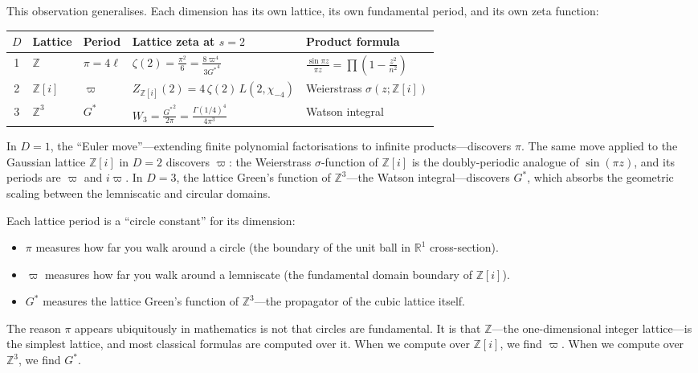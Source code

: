 \documentclass[12pt]{article}
\newcommand{\Z}{\mathbb{Z}}
\newcommand{\R}{\mathbb{R}}
\begin{document}
This observation generalises.  Each dimension has its own lattice, its
own fundamental period, and its own zeta function:

\medskip
\begin{center}
\begin{tabular}{cllll}
\toprule
$D$ & Lattice & Period & Lattice zeta at $s=2$ & Product formula\\
\midrule
1 & $\Z$ & $\pi = 4\ell$
  & $\displaystyle\zeta(2) = \frac{\pi^2}{6} = \frac{8\varpi^4}{3{G^{*}}^4}$
  & $\displaystyle\frac{\sin\pi z}{\pi z} = \prod\!\left(1-\frac{z^2}{n^2}\right)$\\[10pt]
2 & $\Z[i]$ & $\varpi$
  & $\displaystyle Z_{\Z[i]}(2) = 4\,\zeta(2)\,L(2,\chi_{-4})$
  & Weierstrass $\sigma(z;\Z[i])$\\[10pt]
3 & $\Z^3$ & ${G^{*}}$
  & $\displaystyle W_3 = \frac{{G^{*}}^2}{2\pi} = \frac{\Gamma(1/4)^4}{4\pi^3}$
  & Watson integral\\
\bottomrule
\end{tabular}
\end{center}
\medskip

In $D = 1$, the ``Euler move''---extending finite polynomial
factorisations to infinite products---discovers $\pi$.  The same move
applied to the Gaussian lattice $\Z[i]$ in $D = 2$ discovers $\varpi$:
the Weierstrass $\sigma$-function of $\Z[i]$ is the doubly-periodic
analogue of $\sin(\pi z)$, and its periods are $\varpi$ and $i\varpi$.  In
$D = 3$, the lattice Green's function of $\Z^3$---the Watson
integral---discovers ${G^{*}}$, which absorbs the geometric scaling
between the lemniscatic and circular domains.

Each lattice period is a ``circle constant'' for its dimension:
\begin{itemize}
\item $\pi$ measures how far you walk around a circle (the boundary of
  the unit ball in $\R^1$ cross-section).
\item $\varpi$ measures how far you walk around a lemniscate (the
  fundamental domain boundary of $\Z[i]$).
\item ${G^{*}}$ measures the lattice Green's function of $\Z^3$---the
  propagator of the cubic lattice itself.
\end{itemize}

The reason $\pi$ appears ubiquitously in mathematics is not that circles
are fundamental.  It is that $\Z$---the one-dimensional integer
lattice---is the simplest lattice, and most classical formulas are
computed over it.  When we compute over $\Z[i]$, we find $\varpi$.  When
we compute over $\Z^3$, we find ${G^{*}}$.
\end{document}
